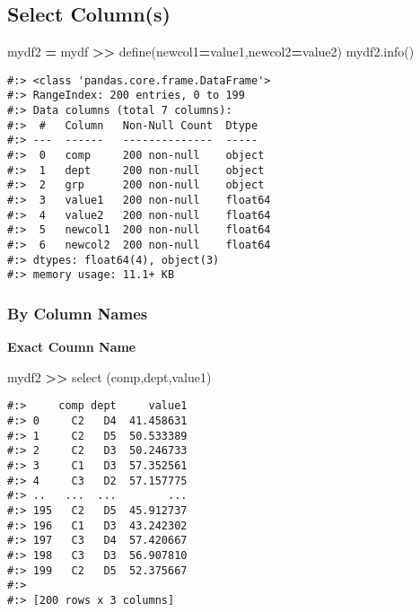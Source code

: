 \documentclass[
]{book}
\newenvironment{Shaded}{\begin{snugshade}}{\end{snugshade}}
\newcommand{\NormalTok}[1]{#1}
\newcommand{\OperatorTok}[1]{\textcolor[rgb]{0.43,0.43,0.43}{\textbf{#1}}}
\newcommand{\StringTok}[1]{\textcolor[rgb]{0.5,0.5,0.5}{#1}}
\begin{document}
\hypertarget{select-columns}{%
\subsection{Select Column(s)}\label{select-columns}}

\begin{Shaded}
\begin{Highlighting}[]
\NormalTok{mydf2 }\OperatorTok{=}\NormalTok{ mydf }\OperatorTok{\textgreater{}\textgreater{}}\NormalTok{ define(newcol1}\OperatorTok{=}\StringTok{\textquotesingle{}value1\textquotesingle{}}\NormalTok{,newcol2}\OperatorTok{=}\StringTok{\textquotesingle{}value2\textquotesingle{}}\NormalTok{)}
\NormalTok{mydf2.info()}
\end{Highlighting}
\end{Shaded}

\begin{verbatim}
#:> <class 'pandas.core.frame.DataFrame'>
#:> RangeIndex: 200 entries, 0 to 199
#:> Data columns (total 7 columns):
#:>  #   Column   Non-Null Count  Dtype  
#:> ---  ------   --------------  -----  
#:>  0   comp     200 non-null    object 
#:>  1   dept     200 non-null    object 
#:>  2   grp      200 non-null    object 
#:>  3   value1   200 non-null    float64
#:>  4   value2   200 non-null    float64
#:>  5   newcol1  200 non-null    float64
#:>  6   newcol2  200 non-null    float64
#:> dtypes: float64(4), object(3)
#:> memory usage: 11.1+ KB
\end{verbatim}

\hypertarget{by-column-names}{%
\subsubsection{By Column Names}\label{by-column-names}}

\textbf{Exact Coumn Name}

\begin{Shaded}
\begin{Highlighting}[]
\NormalTok{mydf2 }\OperatorTok{\textgreater{}\textgreater{}}\NormalTok{ select (}\StringTok{\textquotesingle{}comp\textquotesingle{}}\NormalTok{,}\StringTok{\textquotesingle{}dept\textquotesingle{}}\NormalTok{,}\StringTok{\textquotesingle{}value1\textquotesingle{}}\NormalTok{)}
\end{Highlighting}
\end{Shaded}

\begin{verbatim}
#:>     comp dept     value1
#:> 0     C2   D4  41.458631
#:> 1     C2   D5  50.533389
#:> 2     C2   D3  50.246733
#:> 3     C1   D3  57.352561
#:> 4     C3   D2  57.157775
#:> ..   ...  ...        ...
#:> 195   C2   D5  45.912737
#:> 196   C1   D3  43.242302
#:> 197   C3   D4  57.420667
#:> 198   C3   D3  56.907810
#:> 199   C2   D5  52.375667
#:> 
#:> [200 rows x 3 columns]
\end{verbatim}
\end{document}
